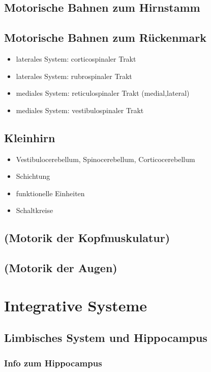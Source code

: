 \documentclass[12pt,a4paper,pdftex]{article}
\begin{document}
\subsection{Motorische Bahnen zum Hirnstamm}
\subsection{Motorische Bahnen zum Rückenmark}
\begin{itemize}
    \item laterales System: corticospinaler Trakt
    \item laterales System: rubrospinaler Trakt
    \item mediales System: reticulospinaler Trakt (medial,lateral)
    \item mediales System: vestibulospinaler Trakt
\end{itemize}
\subsection{Kleinhirn}
\begin{itemize}
    \item Vestibulocerebellum, Spinocerebellum, Corticocerebellum 
    \item Schichtung
    \item funktionelle Einheiten
    \item Schaltkreise
\end{itemize}
\subsection{(Motorik der Kopfmuskulatur)}
\subsection{(Motorik der Augen)}

\newpage
\section{Integrative Systeme}
\subsection{Limbisches System und Hippocampus}

\subsubsection*{Info zum Hippocampus}
\end{document}
